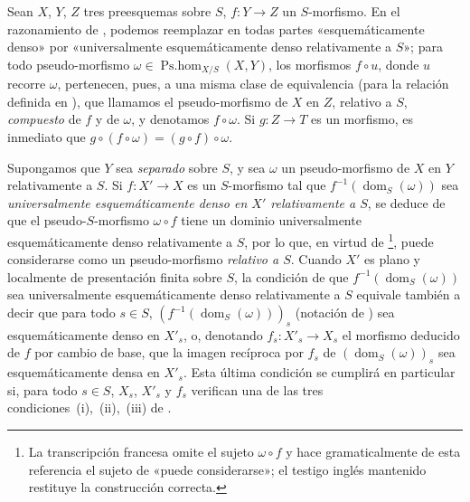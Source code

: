 \begin{env}[20.5.5]
\label{IV.20.5.5}
Sean $X$, $Y$, $Z$ tres preesquemas sobre $S$, $f:Y\to Z$ un $S$-morfismo.
En el razonamiento de , podemos reemplazar en todas partes «esquemáticamente denso» por «universalmente esquemáticamente denso relativamente a $S$»; para todo pseudo-morfismo $\omega\in\operatorname{Ps.hom}_{X/S}(X,Y)$, los morfismos $f\circ u$, donde $u$ recorre $\omega$, pertenecen, pues, a una misma clase de equivalencia (para la relación definida en ), que llamamos el pseudo-morfismo de $X$ en $Z$, relativo a $S$, \emph{compuesto} de $f$ y de $\omega$, y denotamos $f\circ\omega$.
Si $g:Z\to T$ es un morfismo, es inmediato que $g\circ(f\circ\omega)=(g\circ f)\circ\omega$.
\end{env}

\begin{env}[20.5.6]
\label{IV.20.5.6}
Supongamos que $Y$ sea \emph{separado} sobre $S$, y sea $\omega$ un pseudo-morfismo de $X$ en $Y$ relativamente a $S$.
Si $f:X'\to X$ es un $S$-morfismo tal que $f^{-1}(\operatorname{dom}_S(\omega))$ sea \emph{universalmente esquemáticamente denso en $X'$ relativamente a $S$}, se deduce de  que el pseudo-$S$-morfismo $\omega\circ f$ tiene un dominio universalmente esquemáticamente denso relativamente a $S$, por lo que, en virtud de \footnote{La transcripción francesa omite el sujeto $\omega\circ f$ y hace gramaticalmente de esta referencia el sujeto de «puede considerarse»; el testigo inglés mantenido restituye la construcción correcta.}, puede considerarse como un pseudo-morfismo \emph{relativo a $S$}.
Cuando $X'$ es plano y localmente de presentación finita sobre $S$, la condición de que $f^{-1}(\operatorname{dom}_S(\omega))$ sea universalmente esquemáticamente denso relativamente a $S$ equivale también a decir que para todo $s\in S$, $(f^{-1}(\operatorname{dom}_S(\omega)))_s$ (notación de ) sea esquemáticamente denso en $X'_s$, o, denotando $f_s:X'_s\to X_s$ el morfismo deducido de $f$ por cambio de base, que la imagen recíproca por $f_s$ de $(\operatorname{dom}_S(\omega))_s$ sea esquemáticamente densa en $X'_s$.
Esta última condición se cumplirá en particular si, para todo $s\in S$, $X_s$, $X'_s$ y $f_s$ verifican una de las tres condiciones~(i),~(ii),~(iii) de .
\end{env}

